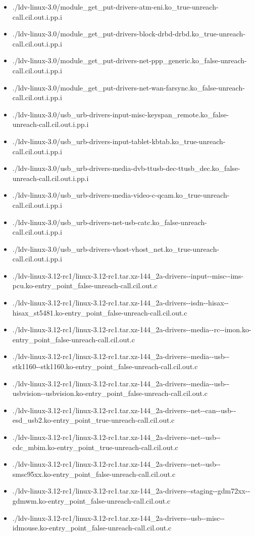\documentclass[envcountsame]{llncs}
\begin{document}
\begin{itemize}
\item ./ldv-linux-3.0/module\_get\_put-drivers-atm-eni.ko\_true-unreach-call.cil.out.i.pp.i
\item ./ldv-linux-3.0/module\_get\_put-drivers-block-drbd-drbd.ko\_true-unreach-call.cil.out.i.pp.i
\item ./ldv-linux-3.0/module\_get\_put-drivers-net-ppp\_generic.ko\_false-unreach-call.cil.out.i.pp.i
\item ./ldv-linux-3.0/module\_get\_put-drivers-net-wan-farsync.ko\_false-unreach-call.cil.out.i.pp.i
\item ./ldv-linux-3.0/usb\_urb-drivers-input-misc-keyspan\_remote.ko\_false-unreach-call.cil.out.i.pp.i
\item ./ldv-linux-3.0/usb\_urb-drivers-input-tablet-kbtab.ko\_true-unreach-call.cil.out.i.pp.i
\item ./ldv-linux-3.0/usb\_urb-drivers-media-dvb-ttusb-dec-ttusb\_dec.ko\_false-unreach-call.cil.out.i.pp.i
\item ./ldv-linux-3.0/usb\_urb-drivers-media-video-c-qcam.ko\_true-unreach-call.cil.out.i.pp.i
\item ./ldv-linux-3.0/usb\_urb-drivers-net-usb-catc.ko\_false-unreach-call.cil.out.i.pp.i
\item ./ldv-linux-3.0/usb\_urb-drivers-vhost-vhost\_net.ko\_true-unreach-call.cil.out.i.pp.i


\item ./ldv-linux-3.12-rc1/linux-3.12-rc1.tar.xz-144\_2a-drivers-{}-input-{}-misc-{}-ims-pcu.ko-entry\_point\_false-unreach-call.cil.out.c
\item ./ldv-linux-3.12-rc1/linux-3.12-rc1.tar.xz-144\_2a-drivers-{}-isdn-{}-hisax-{}-hisax\_st5481.ko-entry\_point\_false-unreach-call.cil.out.c
\item ./ldv-linux-3.12-rc1/linux-3.12-rc1.tar.xz-144\_2a-drivers-{}-media-{}-rc-{}-imon.ko-entry\_point\_false-unreach-call.cil.out.c
\item ./ldv-linux-3.12-rc1/linux-3.12-rc1.tar.xz-144\_2a-drivers-{}-media-{}-usb-{}-stk1160-{}-stk1160.ko-entry\_point\_false-unreach-call.cil.out.c
\item ./ldv-linux-3.12-rc1/linux-3.12-rc1.tar.xz-144\_2a-drivers-{}-media-{}-usb-{}-usbvision-{}-usbvision.ko-entry\_point\_false-unreach-call.cil.out.c
\item ./ldv-linux-3.12-rc1/linux-3.12-rc1.tar.xz-144\_2a-drivers-{}-net-{}-can-{}-usb-{}-esd\_usb2.ko-entry\_point\_true-unreach-call.cil.out.c
\item ./ldv-linux-3.12-rc1/linux-3.12-rc1.tar.xz-144\_2a-drivers-{}-net-{}-usb-{}-cdc\_mbim.ko-entry\_point\_true-unreach-call.cil.out.c
\item ./ldv-linux-3.12-rc1/linux-3.12-rc1.tar.xz-144\_2a-drivers-{}-net-{}-usb-{}-smsc95xx.ko-entry\_point\_false-unreach-call.cil.out.c
\item ./ldv-linux-3.12-rc1/linux-3.12-rc1.tar.xz-144\_2a-drivers-{}-staging-{}-gdm72xx-{}-gdmwm.ko-entry\_point\_false-unreach-call.cil.out.c
\item ./ldv-linux-3.12-rc1/linux-3.12-rc1.tar.xz-144\_2a-drivers-{}-usb-{}-misc-{}-idmouse.ko-entry\_point\_false-unreach-call.cil.out.c



\end{itemize}
\end{document}
